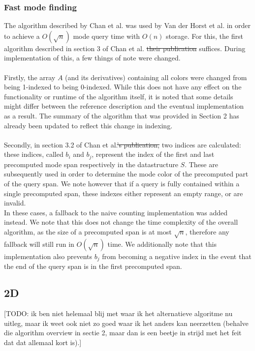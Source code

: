 \documentclass{article}
\newcommand{\todo}[1]{{\color{red}[#1]}}
\newcommand{\fbrm}[1]{{\color{blue}\st{#1}}}
\begin{document}
\subsubsection{Fast mode finding}
The algorithm described by Chan et al. \cite{Chan2014} was used by Van der
Horst et al. in order to achieve a $O(\sqrt{n})$ mode query time with $O(n)$
storage. For this, the first algorithm described in section 3 of Chan et al.
\fbrm{their publication} suffices. During implementation of this, a few things of note
were changed.\\\\ Firstly, the array $A$ (and its derivatives) containing all
colors were changed from being 1-indexed to being 0-indexed. While this does
not have any effect on the functionality or runtime of the algorithm itself, it
is noted that some details might differ between the reference description and
the eventual implementation as a result. The summary of the algorithm that was
provided in Section 2 has already been updated to reflect this change in
indexing.\\\\ Secondly, in section 3.2 of Chan et al.\fbrm{'s publication,} two
indices are calculated: these indices, called $b_i$ and $b_j$, represent the
index of the first and last precomputed mode span respectively in the
datastructure $S$. These are subsequently used in order to determine the mode
color of the precomputed part of the query span. We note however that if a
query is fully contained within a single precomputed span, these indexes either
represent an empty range, or are invalid. \\ In these cases, a fallback to the
naive counting implementation was added instead. We note that this does not
change the time complexity of the overall algorithm, as the size of a
precomputed span is at most $\sqrt{n}$, therefore any fallback will still run
in $O(\sqrt{n})$ time. We additionally note that this implementation also
prevents $b_j$ from becoming a negative index in the event that the end of the
query span is in the first precomputed span.
\subsection{2D}
\todo{TODO: ik ben niet helemaal blij met waar ik het alternatieve algoritme nu
    uitleg, maar ik weet ook niet zo goed waar ik het anders kan neerzetten
    (behalve die algorithm overview in sectie 2, maar dan is een beetje in strijd
    met het feit dat dat allemaal kort is).}
\end{document}
